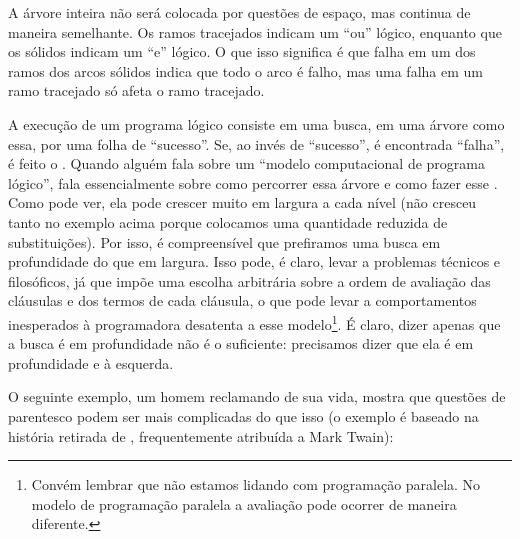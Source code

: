 A árvore inteira não será colocada por questões de espaço, mas
continua de maneira semelhante. Os ramos tracejados indicam um ``ou''
lógico, enquanto que os sólidos indicam um ``e'' lógico. O que isso
significa é que falha em um dos ramos dos arcos sólidos indica que
todo o arco é falho, mas uma falha em um ramo tracejado só afeta o
ramo tracejado.

A execução de um programa lógico consiste em uma busca, em uma árvore
como essa, por uma folha de ``sucesso''. Se, ao invés de ``sucesso'',
é encontrada ``falha'', é feito o . Quando
alguém fala sobre um ``modelo computacional de programa lógico'', fala
essencialmente sobre como percorrer essa árvore e como fazer esse
.  Como pode ver, ela pode crescer muito em
largura a cada nível (não cresceu tanto no exemplo acima porque
colocamos uma quantidade reduzida de substituições). Por isso, é
compreensível que prefiramos uma busca em profundidade do que em
largura. Isso pode, é claro, levar a problemas técnicos e filosóficos,
já que impõe uma escolha arbitrária sobre a ordem de avaliação das
cláusulas e dos termos de cada cláusula, o que pode levar a
comportamentos inesperados à programadora desatenta a esse
modelo\footnote{Convém lembrar que não estamos lidando com programação
  paralela.  No modelo de programação paralela a avaliação pode
  ocorrer de maneira diferente.}. É claro, dizer apenas que a busca é
em profundidade não é o suficiente: precisamos dizer que ela é em
profundidade e à esquerda.

O seguinte exemplo, um homem reclamando de sua vida, mostra que
questões de parentesco podem ser mais complicadas do que isso (o
exemplo é baseado na história retirada de \cite{antoni},
frequentemente atribuída a Mark Twain):


